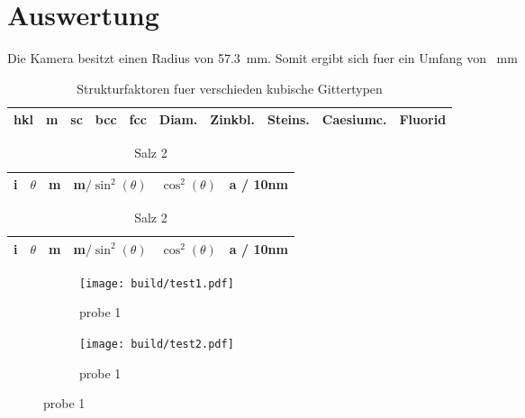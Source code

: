 \section{Auswertung}\label{sec:Auswertung}

Die Kamera besitzt einen Radius von \SI{57.3}{\milli\meter}.
Somit ergibt sich fuer ein Umfang von \SI{}{\milli\meter}

\begin{table}[h]
		\centering
		\caption{Strukturfaktoren fuer verschieden kubische Gittertypen}
		\label{tab:label}
		\begin{tabular}{c c c c c c c c c c}
				\toprule
				hkl & m & sc & bcc & fcc & Diam. & Zinkbl. & Steins. & Caesiumc. & Fluorid \\ 
				\midrule
					
				\bottomrule
		\end{tabular}
\end{table}

\begin{table}[h]
		\centering
		\caption{Reflexe der Proben}
		\label{tab:label}
		\begin{subtable}{0.9\textwidth}
				\centering
				\caption{Probe 2}
				\begin{tabular}{c c c c c c}
						\toprule
						i & $\theta$ & m & m$/\sin^2(\theta)$ & $\cos^2(\theta)$ & a / 10nm \\ 
						\midrule
						
						\bottomrule
				\end{tabular}
		\end{subtable}
		\begin{subtable}{0.9\textwidth}
				\centering
				\caption{Salz 2}
				\begin{tabular}{c c c c c c}
						\toprule
						i & $\theta$ & m & m$/\sin^2(\theta)$ & $\cos^2(\theta)$ & a / 10nm \\ 
						\midrule
						
						\bottomrule
				\end{tabular}
		\end{subtable}
\end{table}

\begin{figure}[h]
		\centering
		\begin{subfigure}{0.49\textwidth}
				\centering
				\texttt{[image: build/test1.pdf]}
				\caption{probe 1}
				\label{fig:prb1}
		\end{subfigure}
		\begin{subfigure}{0.49\textwidth}
				\centering
				\texttt{[image: build/test2.pdf]}
				\caption{probe 1}
				\label{fig:prb1}
		\end{subfigure}
\end{figure}
